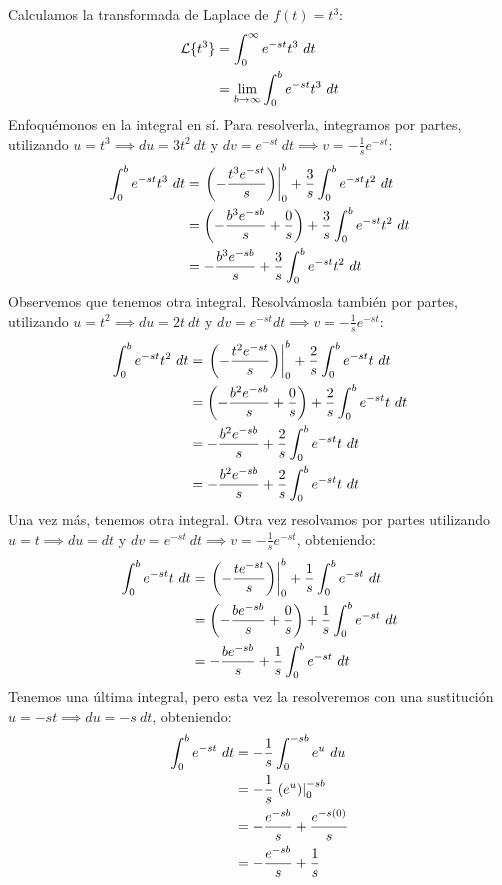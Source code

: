 \documentclass[12pt, a4paper]{article}
\begin{document}
Calculamos la transformada de Laplace de \(f(t) = t^{3}\):
\begin{align} \label{eq:primera-exp}
    \mathcal{L}\{t^3\}&=\int_0^\infty e^{-st}t^3\ dt\ \notag \\
    &=\lim_{b\to\infty}\int_0^b e^{-st}t^3\ dt
\end{align}
Enfoquémonos en la integral en sí. Para resolverla, integramos por partes, utilizando \(u= t^3 \implies du= 3t^2\ dt\) y \(dv=e^{-st}\ dt \implies v=-\frac{1}{s}e^{-st}\):
\begin{align} \label{eq:primera-int}
    \int_0^b e^{-st}t^3\ dt &= \left. \left( -\frac{t^3 e^{-st}}{s}\right) \right|_0^b + \frac{3}{s} \int_0^b e^{-st}t^2 \ dt \notag \\
    &= \left( -\frac{b^3e^{-sb}}{s}+\frac{0}{s} \right) +\frac{3}{s}\int_0^b e^{-st}t^2\ dt \notag \\
    &=-\frac{b^3e^{-sb}}{s} + \frac{3}{s}\int_0^b e^{-st}t^2\ dt
\end{align}
Observemos que tenemos otra integral. Resolvámosla también por partes, utilizando \(u=t^2\implies du=2t\ dt\) y \(dv=e^{-st}dt\implies v=-\frac{1}{s}e^{-st}\):
\begin{align} \label{eq:segunda-int}
    \int_0^b e^{-st}t^2\ dt&= \left. \left( -\frac{t^2 e^{-st}}{s} \right) \right|_0^b + \frac{2}{s} \int_0^b e^{-st}t\ dt \notag \\
    &= \left( -\frac{b^2e^{-sb}}{s}+\frac{0}{s} \right) + \frac{2}{s} \int_0^b e^{-st}t \ dt \notag \\
    &=-\frac{b^2e^{-sb}}{s}+\frac{2}{s}\int_0^b e^{-st}t \ dt \notag \\
    &=-\frac{b^2e^{-sb}}{s}+\frac{2}{s}\int_0^b e^{-st}t \ dt
\end{align}
Una vez más, tenemos otra integral. Otra vez resolvamos por partes utilizando \(u=t\implies du=dt\) y \(dv=e^{-st}\ dt\implies v=-\frac{1}{s}e^{-st}\), obteniendo:
\begin{align} \label{eq:tercera-int}
    \int_0^b e^{-st}t\ dt &= \left. \left(-\frac{te^{-st}}{s} \right) \right|_0^b + \frac{1}{s} \int_0^b e^{-st}\ dt \notag \\
    &= \left( -\frac{be^{-sb}}{s}+\frac{0}{s} \right) +\frac{1}{s} \int_0^b e^{-st}\ dt \notag \\
    &=-\frac{be^{-sb}}{s}+\frac{1}{s}\int_0^b e^{-st}\ dt
\end{align}
Tenemos una última integral, pero esta vez la resolveremos con una sustitución \(u = -st \implies du = -s\ dt\), obteniendo:
\begin{align} \label{eq:cuarta-int}
    \int_0^b e^{-st}\ dt&=-\frac{1}{s}\int_0^{-sb} e^u\ du \notag \\
    &=-\frac{1}{s} \left. \left( e^u \right) \right|_0^{-sb} \notag \\
    &=-\frac{e^{-sb}}{s}+\frac{e^{-s(0)}}{s} \notag \\
    &=-\frac{e^{-sb}}{s}+\frac{1}{s}
\end{align}
\end{document}
